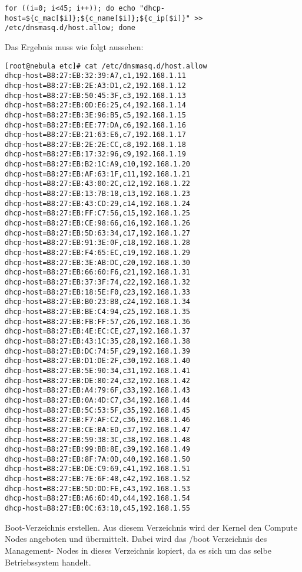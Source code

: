 \begin{lstlisting}
for ((i=0; i<45; i++)); do echo "dhcp-host=${c_mac[$i]};${c_name[$i]};${c_ip[$i]}" >> /etc/dnsmasq.d/host.allow; done
\end{lstlisting}

Das Ergebnis muss wie folgt aussehen:
\begin{lstlisting}
[root@nebula etc]# cat /etc/dnsmasq.d/host.allow
dhcp-host=B8:27:EB:32:39:A7,c1,192.168.1.11
dhcp-host=B8:27:EB:2E:A3:D1,c2,192.168.1.12
dhcp-host=B8:27:EB:50:45:3F,c3,192.168.1.13
dhcp-host=B8:27:EB:0D:E6:25,c4,192.168.1.14
dhcp-host=B8:27:EB:3E:96:B5,c5,192.168.1.15
dhcp-host=B8:27:EB:EE:77:DA,c6,192.168.1.16
dhcp-host=B8:27:EB:21:63:E6,c7,192.168.1.17
dhcp-host=B8:27:EB:2E:2E:CC,c8,192.168.1.18
dhcp-host=B8:27:EB:17:32:96,c9,192.168.1.19
dhcp-host=B8:27:EB:B2:1C:A9,c10,192.168.1.20
dhcp-host=B8:27:EB:AF:63:1F,c11,192.168.1.21
dhcp-host=B8:27:EB:43:00:2C,c12,192.168.1.22
dhcp-host=B8:27:EB:13:7B:18,c13,192.168.1.23
dhcp-host=B8:27:EB:43:CD:29,c14,192.168.1.24
dhcp-host=B8:27:EB:FF:C7:56,c15,192.168.1.25
dhcp-host=B8:27:EB:CE:98:66,c16,192.168.1.26
dhcp-host=B8:27:EB:5D:63:34,c17,192.168.1.27
dhcp-host=B8:27:EB:91:3E:0F,c18,192.168.1.28
dhcp-host=B8:27:EB:F4:65:EC,c19,192.168.1.29
dhcp-host=B8:27:EB:3E:AB:DC,c20,192.168.1.30
dhcp-host=B8:27:EB:66:60:F6,c21,192.168.1.31
dhcp-host=B8:27:EB:37:3F:74,c22,192.168.1.32
dhcp-host=B8:27:EB:18:5E:F0,c23,192.168.1.33
dhcp-host=B8:27:EB:B0:23:B8,c24,192.168.1.34
dhcp-host=B8:27:EB:BE:C4:94,c25,192.168.1.35
dhcp-host=B8:27:EB:FB:FF:57,c26,192.168.1.36
dhcp-host=B8:27:EB:4E:EC:CE,c27,192.168.1.37
dhcp-host=B8:27:EB:43:1C:35,c28,192.168.1.38
dhcp-host=B8:27:EB:DC:74:5F,c29,192.168.1.39
dhcp-host=B8:27:EB:D1:DE:2F,c30,192.168.1.40
dhcp-host=B8:27:EB:5E:90:34,c31,192.168.1.41
dhcp-host=B8:27:EB:DE:80:24,c32,192.168.1.42
dhcp-host=B8:27:EB:A4:79:6F,c33,192.168.1.43
dhcp-host=B8:27:EB:0A:4D:C7,c34,192.168.1.44
dhcp-host=B8:27:EB:5C:53:5F,c35,192.168.1.45
dhcp-host=B8:27:EB:F7:AF:C2,c36,192.168.1.46
dhcp-host=B8:27:EB:CE:BA:ED,c37,192.168.1.47
dhcp-host=B8:27:EB:59:38:3C,c38,192.168.1.48
dhcp-host=B8:27:EB:99:BB:8E,c39,192.168.1.49
dhcp-host=B8:27:EB:8F:7A:0D,c40,192.168.1.50
dhcp-host=B8:27:EB:DE:C9:69,c41,192.168.1.51
dhcp-host=B8:27:EB:7E:6F:48,c42,192.168.1.52
dhcp-host=B8:27:EB:5D:DD:FE,c43,192.168.1.53
dhcp-host=B8:27:EB:A6:6D:4D,c44,192.168.1.54
dhcp-host=B8:27:EB:0C:63:10,c45,192.168.1.55
\end{lstlisting}

Boot-Verzeichnis erstellen. Aus diesem Verzeichnis wird der Kernel den Compute Nodes angeboten und übermittelt. Dabei wird das /boot Verzeichnis des Management- Nodes in dieses Verzeichnis kopiert, da es sich um das selbe Betriebssystem handelt.

